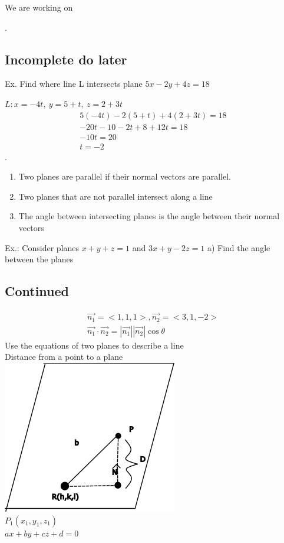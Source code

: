 \documentclass[12pt]{article}
\begin{document}
We are working on
.

\subsection{Incomplete do later}
Ex. 
Find where line L intersects plane $5x-2y+4z=18$

$L: x= -4t,\ y=5+t,\ z=2+3t$
\begin{align}
5(-4t)-2(5+t)+4(2+3t)=18\\
-20t-10-2t+8+12t=18\\
-10t=20\\
t=-2
\end{align}.
\begin{enumerate}
	\item Two planes are parallel if their normal vectors are parallel.
	\item Two planes that are not parallel intersect along a line
	\item The angle between intersecting planes is the angle between their normal vectors 
\end{enumerate}

Ex.: Consider planes $x+y+z=1$ and $3x+y-2z=1$
a) Find the angle between the planes
\subsection{Continued}
\begin{align}
	\vec{n_1}=<1,1,1>,\vec{n_2}=<3,1,-2> \\%
	\vec{n_1} \cdot {\vec{n_2}}=|\vec{n_1}||\vec{n_2}|\cos\theta 
\end{align}
Use the equations of two planes to describe a line\\%
Distance from a point to a plane\\%
\includegraphics{ramppbn}\\%
$P_1(x_1,y_1,z_1)$\\%
$ax+by+cz+d=0$
\end{document}
